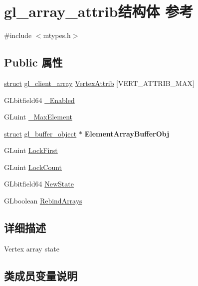 \hypertarget{structgl__array__attrib}{}\section{gl\+\_\+array\+\_\+attrib结构体 参考}
\label{structgl__array__attrib}


{\ttfamily \#include $<$mtypes.\+h$>$}

\subsection*{Public 属性}
\begin{DoxyCompactItemize}
\item 
\hyperlink{interfacestruct}{struct} \hyperlink{structgl__client__array}{gl\+\_\+client\+\_\+array} \hyperlink{structgl__array__attrib_aaf500971e8398c4136ec4efd851619cc}{Vertex\+Attrib} \mbox{[}V\+E\+R\+T\+\_\+\+A\+T\+T\+R\+I\+B\+\_\+\+M\+AX\mbox{]}
\item 
G\+Lbitfield64 \hyperlink{structgl__array__attrib_a9376785310902ca6a9b15ead92ebf8cd}{\+\_\+\+Enabled}
\item 
G\+Luint \hyperlink{structgl__array__attrib_a3762aeca3258054df5c9dbd0dbd8a52c}{\+\_\+\+Max\+Element}
\item 
\mbox{\label{structgl__array__attrib_a02c750f8792d63535a46bf51fc65235f}} 
\hyperlink{interfacestruct}{struct} \hyperlink{structgl__buffer__object}{gl\+\_\+buffer\+\_\+object} $\ast$ {\bfseries Element\+Array\+Buffer\+Obj}
\item 
G\+Luint \hyperlink{structgl__array__attrib_a1493fecf20e998e0c80376bdf3e7ef51}{Lock\+First}
\item 
G\+Luint \hyperlink{structgl__array__attrib_abb535ffa5048098b6048e8ae87ba05f2}{Lock\+Count}
\item 
G\+Lbitfield64 \hyperlink{structgl__array__attrib_a937523db48918ec8c595de0888bfe4b8}{New\+State}
\item 
G\+Lboolean \hyperlink{structgl__array__attrib_a0804b68b6f651b7d2a4084a7372e5c0e}{Rebind\+Arrays}
\end{DoxyCompactItemize}


\subsection{详细描述}
Vertex array state 

\subsection{类成员变量说明}
\mbox{\label{structgl__array__attrib_a9376785310902ca6a9b15ead92ebf8cd}} 
